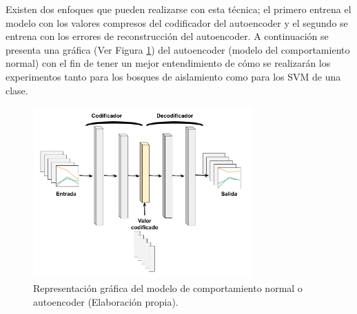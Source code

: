 \vspace{5mm} %

Existen dos enfoques que pueden realizarse con esta t\'{e}cnica; el primero entrena el modelo con los valores compresos del codificador del autoencoder y el segundo se entrena con los errores de reconstrucci\'{o}n del autoencoder. A continuaci\'{o}n se presenta una gr\'{a}fica (Ver Figura \ref{fig:autoencoder}) del autoencoder (modelo del comportamiento normal) con el fin de tener un mejor entendimiento de c\'{o}mo se realizar\'{a}n los experimentos tanto para los bosques de aislamiento como para los SVM de una clase.

\begin{figure}[H]
        \centering
            \includegraphics[width=0.75\textwidth, frame]{imagenes/Cap5/autoencoder}
        \caption{Representaci\'{o}n gr\'{a}fica del modelo de comportamiento normal o autoencoder (Elaboraci\'{o}n propia).}
		\label{fig:autoencoder}
\end{figure}

